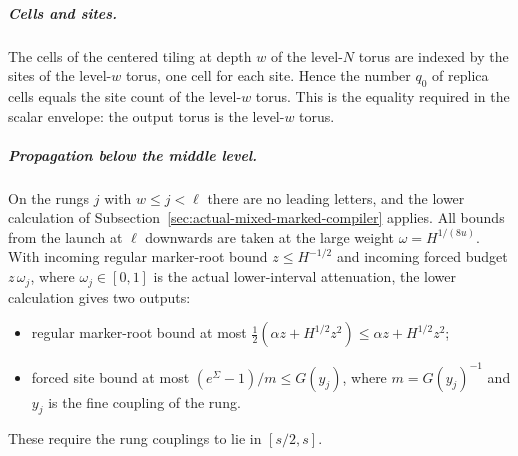 \subparagraph{Cells and sites.}
The cells of the centered tiling at depth $w$ of the level-$N$ torus are
indexed by the sites of the level-$w$ torus, one cell for each site.
Hence the number $q_0$ of replica cells equals the site count of the
level-$w$ torus. This is the equality required in the scalar envelope:
the output torus is the level-$w$ torus.

\subparagraph{Propagation below the middle level.}
On the rungs $j$ with $w\le j<\ell$ there are no leading letters, and the
lower calculation of Subsection~\ref{sec:actual-mixed-marked-compiler}
applies. All bounds from the launch at $\ell$ downwards are taken at the
large weight $\omega=H^{1/(8u)}$. With incoming regular marker-root bound
$z\le H^{-1/2}$ and incoming forced budget $z\,\omega_j$, where
$\omega_j\in[0,1]$ is the actual lower-interval attenuation, the lower
calculation gives two outputs:
\begin{itemize}
\item regular marker-root bound at most
 $\tfrac12(\alpha z+H^{1/2}z^2)\le\alpha z+H^{1/2}z^2$;
\item forced site bound at most $(e^{\Sigma}-1)/m\le G(y_j)$, where
 $m=G(y_j)^{-1}$ and $y_j$ is the fine coupling of the rung.
\end{itemize}
These require the rung couplings to lie in $[s/2,s]$.

